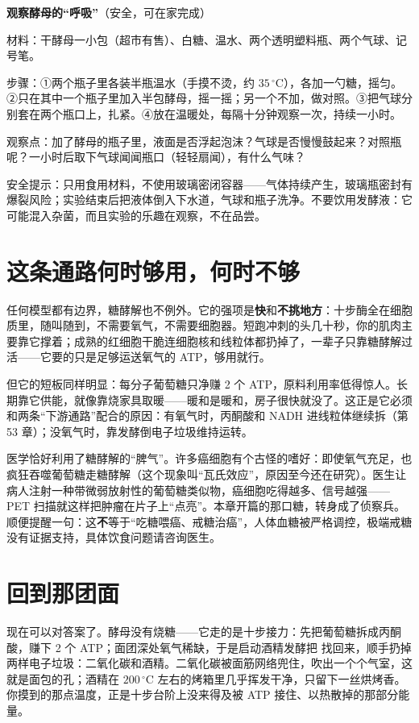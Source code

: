 \begin{shiyan}
\textbf{观察酵母的“呼吸”}（安全，可在家完成）

材料：干酵母一小包（超市有售）、白糖、温水、两个透明塑料瓶、两个气球、记号笔。

步骤：①两个瓶子里各装半瓶温水（手摸不烫，约 $35\,^{\circ}\mathrm{C}$），各加一勺糖，摇匀。②只在其中一个瓶子里加入半包酵母，摇一摇；另一个不加，做对照。③把气球分别套在两个瓶口上，扎紧。④放在温暖处，每隔十分钟观察一次，持续一小时。

观察点：加了酵母的瓶子里，液面是否浮起泡沫？气球是否慢慢鼓起来？对照瓶呢？一小时后取下气球闻闻瓶口（轻轻扇闻），有什么气味？

安全提示：只用食用材料，不使用玻璃密闭容器——气体持续产生，玻璃瓶密封有爆裂风险；实验结束后把液体倒入下水道，气球和瓶子洗净。不要饮用发酵液：它可能混入杂菌，而且实验的乐趣在观察，不在品尝。
\end{shiyan}

\section{这条通路何时够用，何时不够}

任何模型都有边界，糖酵解也不例外。它的强项是\textbf{快}和\textbf{不挑地方}：十步酶全在细胞质里，随叫随到，不需要氧气，不需要细胞器。短跑冲刺的头几十秒，你的肌肉主要靠它撑着；成熟的红细胞干脆连细胞核和线粒体都扔掉了，一辈子只靠糖酵解过活——它要的只是足够运送氧气的 ATP，够用就行。

但它的短板同样明显：每分子葡萄糖只净赚 2 个 ATP，原料利用率低得惊人。长期靠它供能，就像靠烧家具取暖——暖和是暖和，房子很快就没了。这正是它必须和两条“下游通路”配合的原因：有氧气时，丙酮酸和 NADH 进线粒体继续拆（第 53 章）；没氧气时，靠发酵倒电子垃圾维持运转。

医学恰好利用了糖酵解的“脾气”。许多癌细胞有个古怪的嗜好：即使氧气充足，也疯狂吞噬葡萄糖走糖酵解（这个现象叫“瓦氏效应”，原因至今还在研究）。医生让病人注射一种带微弱放射性的葡萄糖类似物，癌细胞吃得越多、信号越强——PET 扫描就这样把肿瘤在片子上“点亮”。本章开篇的那口糖，转身成了侦察兵。顺便提醒一句：这\textbf{不}等于“吃糖喂癌、戒糖治癌”，人体血糖被严格调控，极端戒糖没有证据支持，具体饮食问题请咨询医生。

\section{回到那团面}

现在可以对答案了。酵母没有烧糖——它走的是十步接力：先把葡萄糖拆成丙酮酸，赚下 2 个 ATP；面团深处氧气稀缺，于是启动酒精发酵把  找回来，顺手扔掉两样电子垃圾：二氧化碳和酒精。二氧化碳被面筋网络兜住，吹出一个个气室，这就是面包的孔；酒精在 $200\,^{\circ}\mathrm{C}$ 左右的烤箱里几乎挥发干净，只留下一丝烘烤香。你摸到的那点温度，正是十步台阶上没来得及被 ATP 接住、以热散掉的那部分能量。

